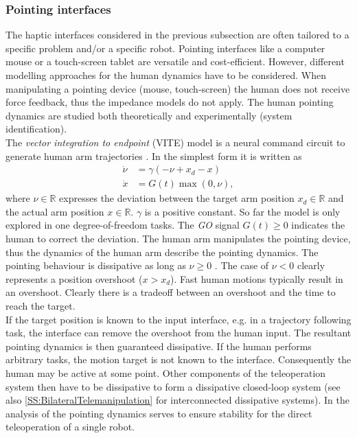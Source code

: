 \documentclass[a4paper,twoside, openright,12pt]{report}
\begin{document}
\subsubsection{Pointing interfaces}
The haptic interfaces considered in the previous subsection are often tailored to a specific problem and/or a specific robot. Pointing interfaces like a computer mouse or a touch-screen tablet are versatile and cost-efficient. However, different modelling approaches for the human dynamics have to be considered. When manipulating a pointing device (mouse, touch-screen) the human does not receive force feedback, thus the impedance models do not apply. The human pointing dynamics are studied both theoretically and experimentally (system identification).\\
The \emph{vector integration to endpoint} (VITE) model is a neural command circuit to generate human arm trajectories \cite{Varnell2013}. In the simplest form it is written as 
\begin{align}
\dot{\nu} &= \gamma(-\nu + x_d - x) \\
\dot{x} &= G(t) \max(0,\nu), \nonumber
\end{align}
where $\nu \in \mathbb{R}$ expresses the deviation between the target arm position $x_d \in \mathbb{R} $ and the actual arm position $x \in \mathbb{R}$. $\gamma$ is a positive constant. So far the model is only explored in one degree-of-freedom tasks. The \emph{GO} signal $G(t)\geq 0$ indicates the human to correct the deviation. The human arm manipulates the pointing device, thus the dynamics of the human arm describe the pointing dynamics. The pointing behaviour is dissipative as long as $\nu \geq 0$ \cite{Varnell2013}. The case of $\nu < 0$ clearly represents a position overshoot ($x>x_d$). Fast human motions typically result in an overshoot. Clearly there is a tradeoff between an overshoot and the time to reach the target.\\
If the target position is known to the input interface, e.g. in a trajectory following task, the interface can remove the overshoot from the human input. The resultant pointing dynamics is then guaranteed dissipative. If the human performs arbitrary tasks, the motion target is not known to the interface. Consequently the human may be active at some point. Other components of the teleoperation system then have to be dissipative to form a dissipative closed-loop system (see also \ref{SS:BilateralTelemanipulation} for interconnected dissipative systems). In \cite{Varnell2013} the analysis of the pointing dynamics serves to ensure stability for the direct teleoperation of a single robot.\\
\end{document}

